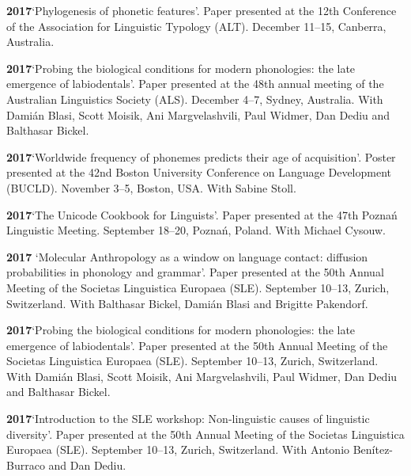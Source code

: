 \documentclass[11pt]{article}
\newcommand{\hangpara}{
 \setlength{\parindent}{0in} %
 \hangindent=0.42in %
}
\begin{document}
\vskip 6pt
\hangpara
{\bf 2017}\hspace{1ex}`Phylogenesis of phonetic features'. Paper presented at the 12th Conference of the Association for Linguistic Typology (ALT). December 11--15, Canberra, Australia.

\vskip 6pt
\hangpara
{\bf 2017}\hspace{1ex}`Probing the biological conditions for modern phonologies: the late emergence of labiodentals'. Paper presented at the 48th annual meeting of the Australian Linguistics Society (ALS). December 4--7, Sydney, Australia. With Dami{\'a}n Blasi, Scott Moisik, Ani Margvelashvili, Paul Widmer, Dan Dediu and Balthasar Bickel.

\vskip 6pt
\hangpara
{\bf 2017}\hspace{1ex}`Worldwide frequency of phonemes predicts their age of acquisition'. Poster presented at the 42nd Boston University Conference on Language Development (BUCLD). November 3--5, Boston, USA. With Sabine Stoll.

\vskip 6pt
\hangpara
{\bf 2017}\hspace{1ex}`The Unicode Cookbook for Linguists'. Paper presented at the 47th Pozna{\'n} Linguistic Meeting. September 18--20, Pozna{\'n}, Poland. With Michael Cysouw. 

\vskip 6pt
\hangpara
{\bf 2017}\hspace{1ex} `Molecular Anthropology as a window on language contact: diffusion probabilities in phonology and grammar'. Paper presented at the 50th Annual Meeting of the Societas Linguistica Europaea (SLE). September 10--13, Zurich, Switzerland. With Balthasar Bickel, Dami{\'a}n Blasi and Brigitte Pakendorf.
 
\vskip 6pt
\hangpara
{\bf 2017}\hspace{1ex}`Probing the biological conditions for modern phonologies: the late emergence of labiodentals'. Paper presented at the 50th Annual Meeting of the Societas Linguistica Europaea (SLE). September 10--13, Zurich, Switzerland. With Dami{\'a}n Blasi, Scott Moisik, Ani Margvelashvili, Paul Widmer, Dan Dediu and Balthasar Bickel.
\vskip 6pt
\hangpara
{\bf 2017}\hspace{1ex}`Introduction to the SLE workshop: Non-linguistic causes of linguistic diversity'. Paper presented at the 50th Annual Meeting of the Societas Linguistica Europaea (SLE). September 10--13, Zurich, Switzerland. With Antonio Benítez-Burraco and Dan Dediu.
\end{document}
